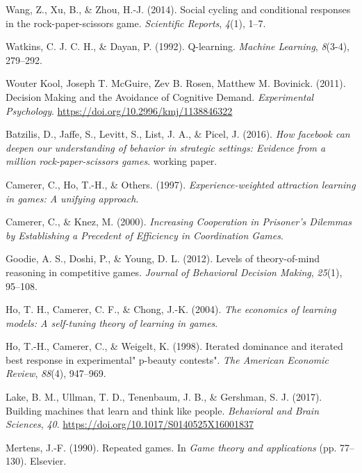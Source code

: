 \documentclass[man,floatsintext]{apa6}
\begin{document}
\leavevmode\hypertarget{ref-wang2014social}{}%
Wang, Z., Xu, B., \& Zhou, H.-J. (2014). Social cycling and conditional responses in the rock-paper-scissors game. \emph{Scientific Reports}, \emph{4}(1), 1--7.

\leavevmode\hypertarget{ref-watkins1992q}{}%
Watkins, C. J. C. H., \& Dayan, P. (1992). Q-learning. \emph{Machine Learning}, \emph{8}(3-4), 279--292.

\leavevmode\hypertarget{ref-Kool_2011}{}%
Wouter Kool, Joseph T. McGuire, Zev B. Rosen, Matthew M. Bovinick. (2011). Decision Making and the Avoidance of Cognitive Demand. \emph{Experimental Psychology}. \url{https://doi.org/10.2996/kmj/1138846322}

\leavevmode\hypertarget{ref-batzilis}{}%
Batzilis, D., Jaffe, S., Levitt, S., List, J. A., \& Picel, J. (2016). \emph{How facebook can deepen our understanding of behavior in strategic settings: Evidence from a million rock-paper-scissors games}. working paper.

\leavevmode\hypertarget{ref-camerer1997experience}{}%
Camerer, C., Ho, T.-H., \& Others. (1997). \emph{Experience-weighted attraction learning in games: A unifying approach}.

\leavevmode\hypertarget{ref-knez2000}{}%
Camerer, C., \& Knez, M. (2000). \emph{Increasing Cooperation in Prisoner's Dilemmas by Establishing a Precedent of Efficiency in Coordination Games}.

\leavevmode\hypertarget{ref-goodie2012levels}{}%
Goodie, A. S., Doshi, P., \& Young, D. L. (2012). Levels of theory-of-mind reasoning in competitive games. \emph{Journal of Behavioral Decision Making}, \emph{25}(1), 95--108.

\leavevmode\hypertarget{ref-ho2004economics}{}%
Ho, T. H., Camerer, C. F., \& Chong, J.-K. (2004). \emph{The economics of learning models: A self-tuning theory of learning in games}.

\leavevmode\hypertarget{ref-ho1998iterated}{}%
Ho, T.-H., Camerer, C., \& Weigelt, K. (1998). Iterated dominance and iterated best response in experimental" p-beauty contests". \emph{The American Economic Review}, \emph{88}(4), 947--969.

\leavevmode\hypertarget{ref-Lake2017}{}%
Lake, B. M., Ullman, T. D., Tenenbaum, J. B., \& Gershman, S. J. (2017). Building machines that learn and think like people. \emph{Behavioral and Brain Sciences}, \emph{40}. \url{https://doi.org/10.1017/S0140525X16001837}

\leavevmode\hypertarget{ref-mertens1990repeated}{}%
Mertens, J.-F. (1990). Repeated games. In \emph{Game theory and applications} (pp. 77--130). Elsevier.
\end{document}
